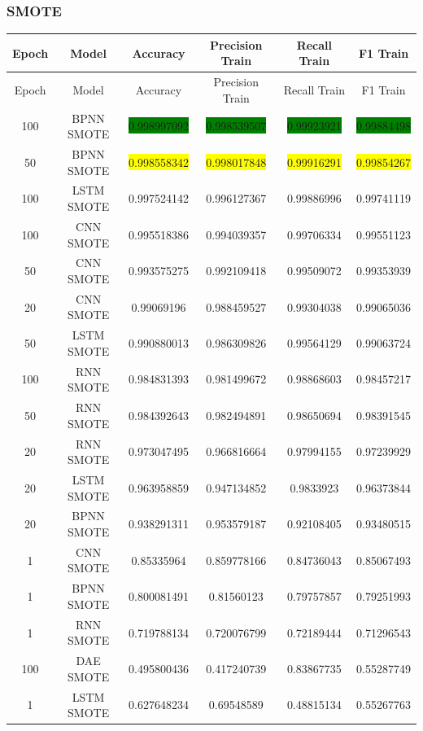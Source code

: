 \subsubsection{SMOTE}
\begin{longtable}{|c|c|c|c|c|c|}
	\hline
	Epoch & Model & Accuracy & Precision Train & Recall Train & F1 Train\\ \hline
	\endfirsthead
	\hline
	Epoch & Model & Accuracy & Precision Train & Recall Train & F1 Train\\ \hline
	\endhead
	100 & BPNN SMOTE & \colorbox{green}{0.998997092} & \colorbox{green}{0.998539507} & \colorbox{green}{0.99923921} & \colorbox{green}{0.99884498}\\ \hline
	50 & BPNN SMOTE & \colorbox{yellow}{0.998558342} & \colorbox{yellow}{0.998017848} & \colorbox{yellow}{0.99916291} & \colorbox{yellow}{0.99854267}\\ \hline
	100 & LSTM SMOTE & 0.997524142 & 0.996127367 & 0.99886996 & 0.99741119\\ \hline
	100 & CNN SMOTE & 0.995518386 & 0.994039357 & 0.99706334 & 0.99551123\\ \hline
	50 & CNN SMOTE & 0.993575275 & 0.992109418 & 0.99509072 & 0.99353939\\ \hline
	20 & CNN SMOTE & 0.99069196 & 0.988459527 & 0.99304038 & 0.99065036\\ \hline
	50 & LSTM SMOTE & 0.990880013 & 0.986309826 & 0.99564129 & 0.99063724\\ \hline
	100 & RNN SMOTE & 0.984831393 & 0.981499672 & 0.98868603 & 0.98457217\\ \hline
	50 & RNN SMOTE & 0.984392643 & 0.982494891 & 0.98650694 & 0.98391545\\ \hline
	20 & RNN SMOTE & 0.973047495 & 0.966816664 & 0.97994155 & 0.97239929\\ \hline
	20 & LSTM SMOTE & 0.963958859 & 0.947134852 & 0.9833923 & 0.96373844\\ \hline
	20 & BPNN SMOTE & 0.938291311 & 0.953579187 & 0.92108405 & 0.93480515\\ \hline
	1 & CNN SMOTE & 0.85335964 & 0.859778166 & 0.84736043 & 0.85067493\\ \hline
	1 & BPNN SMOTE & 0.800081491 & 0.81560123 & 0.79757857 & 0.79251993\\ \hline
	1 & RNN SMOTE & 0.719788134 & 0.720076799 & 0.72189444 & 0.71296543\\ \hline
	100 & DAE SMOTE & 0.495800436 & 0.417240739 & 0.83867735 & 0.55287749\\ \hline
	1 & LSTM SMOTE & 0.627648234 & 0.69548589 & 0.48815134 & 0.55267763\\ \hline

\end{longtable}
